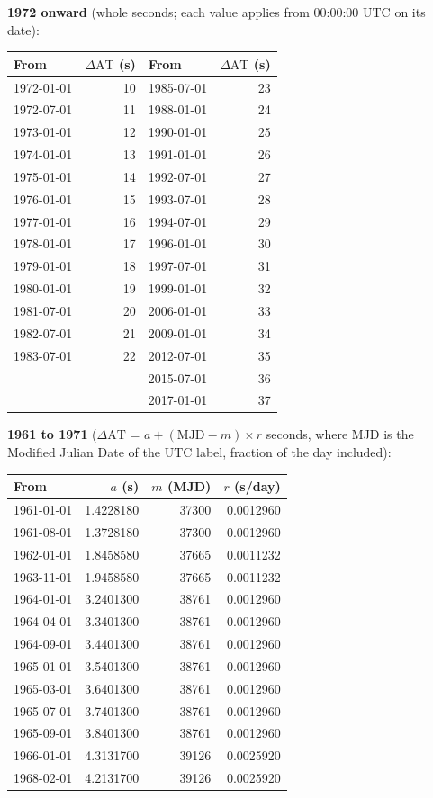 \documentclass[11pt]{article}
\newcommand{\dAT}{\ensuremath{\Delta\mathrm{AT}}}
\begin{document}
\textbf{1972 onward} (whole seconds; each value applies from 00:00:00 UTC on
its date):

\begin{center}
\begin{tabular}{@{}lr@{\qquad}lr@{}}
\toprule
From & \dAT{} (s) & From & \dAT{} (s) \\
\midrule
1972-01-01 & 10 & 1985-07-01 & 23 \\
1972-07-01 & 11 & 1988-01-01 & 24 \\
1973-01-01 & 12 & 1990-01-01 & 25 \\
1974-01-01 & 13 & 1991-01-01 & 26 \\
1975-01-01 & 14 & 1992-07-01 & 27 \\
1976-01-01 & 15 & 1993-07-01 & 28 \\
1977-01-01 & 16 & 1994-07-01 & 29 \\
1978-01-01 & 17 & 1996-01-01 & 30 \\
1979-01-01 & 18 & 1997-07-01 & 31 \\
1980-01-01 & 19 & 1999-01-01 & 32 \\
1981-07-01 & 20 & 2006-01-01 & 33 \\
1982-07-01 & 21 & 2009-01-01 & 34 \\
1983-07-01 & 22 & 2012-07-01 & 35 \\
 & & 2015-07-01 & 36 \\
 & & 2017-01-01 & 37 \\
\bottomrule
\end{tabular}
\end{center}

\textbf{1961 to 1971} (\dAT{} = $a + (\mathrm{MJD} - m) \times r$ seconds,
where MJD is the Modified Julian Date of the UTC label, fraction of the day
included):

\begin{center}
\begin{tabular}{@{}lrrr@{}}
\toprule
From & $a$ (s) & $m$ (MJD) & $r$ (s/day) \\
\midrule
1961-01-01 & 1.4228180 & 37300 & 0.0012960 \\
1961-08-01 & 1.3728180 & 37300 & 0.0012960 \\
1962-01-01 & 1.8458580 & 37665 & 0.0011232 \\
1963-11-01 & 1.9458580 & 37665 & 0.0011232 \\
1964-01-01 & 3.2401300 & 38761 & 0.0012960 \\
1964-04-01 & 3.3401300 & 38761 & 0.0012960 \\
1964-09-01 & 3.4401300 & 38761 & 0.0012960 \\
1965-01-01 & 3.5401300 & 38761 & 0.0012960 \\
1965-03-01 & 3.6401300 & 38761 & 0.0012960 \\
1965-07-01 & 3.7401300 & 38761 & 0.0012960 \\
1965-09-01 & 3.8401300 & 38761 & 0.0012960 \\
1966-01-01 & 4.3131700 & 39126 & 0.0025920 \\
1968-02-01 & 4.2131700 & 39126 & 0.0025920 \\
\bottomrule
\end{tabular}
\end{center}
\end{document}
